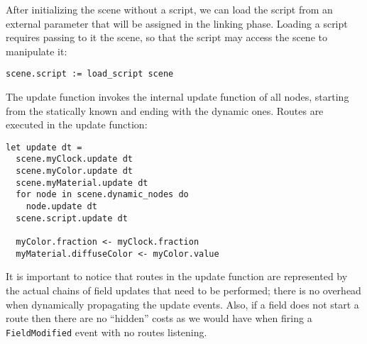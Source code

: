 After initializing the scene without a script, we can load the script from an external parameter that will be assigned in the linking phase. Loading a script requires passing to it the scene, so that the script may access the scene to manipulate it:

\begin{lstlisting}
scene.script := load_script scene
\end{lstlisting}

The update function invokes the internal update function of all nodes, starting from the statically known and ending with the dynamic ones. Routes are executed in the update function:

\begin{lstlisting}
let update dt = 
  scene.myClock.update dt
  scene.myColor.update dt
  scene.myMaterial.update dt
  for node in scene.dynamic_nodes do
    node.update dt
  scene.script.update dt
  
  myColor.fraction <- myClock.fraction
  myMaterial.diffuseColor <- myColor.value
\end{lstlisting}

It is important to notice that routes in the update function are represented by the actual chains of field updates that need to be performed; there is no overhead when dynamically propagating the update events. Also, if a field does not start a route then there are no ``hidden'' costs as we would have when firing a \texttt{FieldModified} event with no routes listening.
